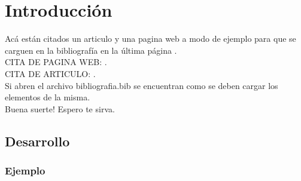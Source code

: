 \section{Introducción}
Acá están citados un articulo y una pagina web a modo de ejemplo para que se carguen en la bibliografía en la última página .\\
CITA DE PAGINA WEB: \cite{PhoenixWebSwitchFO}.\\
CITA DE ARTICULO: \cite{ProtocoloModbus}.\\
Si abren el archivo bibliografia.bib se encuentran como se deben cargar los elementos de la misma.\\

Buena suerte! Espero te sirva.\\

\subsection{Desarrollo}
\lipsum[2-4]
\subsubsection{Ejemplo}
\lipsum[2-4]